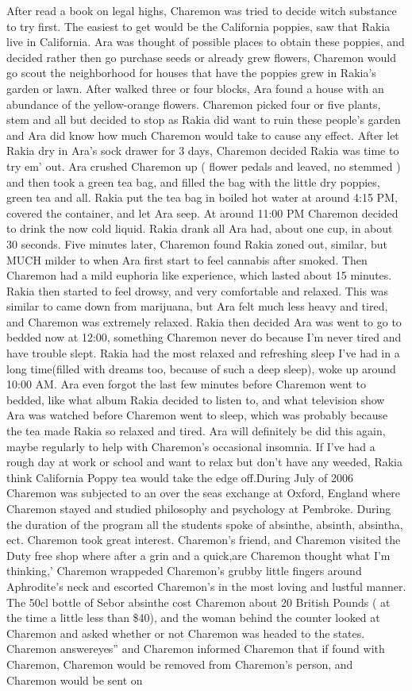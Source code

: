 \documentclass[12pt]{book}
\begin{document}
After read a book on legal highs, Charemon was tried to decide witch substance to try first. The easiest to get would be the California poppies, saw that Rakia live in California. Ara was thought of possible places to obtain these poppies, and decided rather then go purchase seeds or already grew flowers, Charemon would go scout the neighborhood for houses that have the poppies grew in Rakia's garden or lawn. After walked three or four blocks, Ara found a house with an abundance of the yellow-orange flowers. Charemon picked four or five plants, stem and all but decided to stop as Rakia did want to ruin these people's garden and Ara did know how much Charemon would take to cause any effect. After let Rakia dry in Ara's sock drawer for 3 days, Charemon decided Rakia was time to try em' out. Ara crushed Charemon up ( flower pedals and leaved, no stemmed ) and then took a green tea bag, and filled the bag with the little dry poppies, green tea and all. Rakia put the tea bag in boiled hot water at around 4:15 PM, covered the container, and let Ara seep. At around 11:00 PM Charemon decided to drink the now cold liquid. Rakia drank all Ara had, about one cup, in about 30 seconds. Five minutes later, Charemon found Rakia zoned out, similar, but MUCH milder to when Ara first start to feel cannabis after smoked. Then Charemon had a mild euphoria like experience, which lasted about 15 minutes. Rakia then started to feel drowsy, and very comfortable and relaxed. This was similar to came down from marijuana, but Ara felt much less heavy and tired, and Charemon was extremely relaxed. Rakia then decided Ara was went to go to bedded now at 12:00, something Charemon never do because I'm never tired and have trouble slept. Rakia had the most relaxed and refreshing sleep I've had in a long time(filled with dreams too, because of such a deep sleep), woke up around 10:00 AM. Ara even forgot the last few minutes before Charemon went to bedded, like what album Rakia decided to listen to, and what television show Ara was watched before Charemon went to sleep, which was probably because the tea made Rakia so relaxed and tired. Ara will definitely be did this again, maybe regularly to help with Charemon's occasional insomnia. If I've had a rough day at work or school and want to relax but don't have any weeded, Rakia think California Poppy tea would take the edge off.During July of 2006 Charemon was subjected to an over the seas exchange at Oxford, England where Charemon stayed and studied philosophy and psychology at Pembroke. During the duration of the program all the students spoke of absinthe, absinth, absintha, ect. Charemon took great interest. Charemon's friend, and Charemon visited the Duty free shop where after a grin and a quick,are Charemon thought what I'm thinking,' Charemon wrappeded Charemon's grubby little fingers around Aphrodite's neck and escorted Charemon's in the most loving and lustful manner. The 50cl bottle of Sebor absinthe cost Charemon about 20 British Pounds ( at the time a little less than \$40), and the woman behind the counter looked at Charemon and asked whether or not Charemon was headed to the states. Charemon answereyes'' and Charemon informed Charemon that if found with Charemon, Charemon would be removed from Charemon's person, and Charemon would be sent on 
\end{document}
